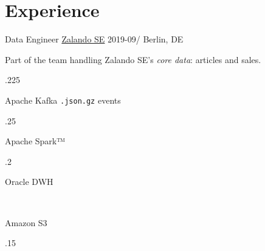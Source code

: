 \documentclass[%
version=last,%
fontsize=11pt,%
paper=A4,%
headinclude=false,%
footinclude=false,%
headlines=0,%
footlines=0,%
areasetadvanced,%
toc=bibnumbered,%
]{scrartcl}%
\begin{document}
\begin{minipage}[t]{0.575\textwidth}
  \section{Experience}%
  \label{sec:experience}
  \WorkEntry%
  {Data Engineer}%
  {\href{https://corporate.zalando.com/en}{Zalando SE}}%
  {2019-09/}%
  {Berlin, DE}%
  {%
    Part of the team handling Zalando SE’s \emph{core data}: articles and
    sales.%
    \medskip%
    \newline%
    \begin{minipagebox}{.225\linewidth}
      \begin{tcolorbox}[title=Nakadi,remember as=Kafka]
        Apache Kafka%
        \tcblower%
        \texttt{.json.gz} events
      \end{tcolorbox}
    \end{minipagebox}%
    \hfill%
    \begin{minipagebox}[16pt]{.25\linewidth}
      \begin{tcolorbox}[title={Databricks on Amazon AWS},remember as=Spark]
        Apache Spark™
      \end{tcolorbox}%
    \end{minipagebox}%
    \hfill%
    \begin{minipagebox}{.2\linewidth}
      \begin{tcolorbox}[remember as=Oracle]
        Oracle DWH
      \end{tcolorbox}%
      \\%
      \begin{tcolorbox}[remember as=S3]
        Amazon S3
      \end{tcolorbox}%
    \end{minipagebox}%
    \hfill%
    \begin{minipagebox}[16pt]{.15\linewidth}
      \begin{tcolorbox}[remember as=Exasol]

\end{tcolorbox}
\end{minipagebox}}
\end{minipage}
\end{document}
